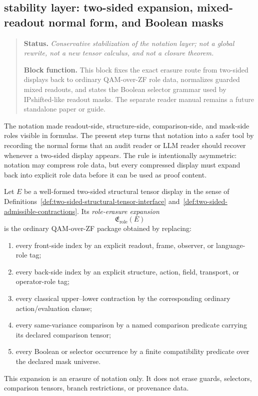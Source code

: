 \subsection*{stability layer: two-sided expansion, mixed-readout normal form, and Boolean masks}
\begin{quote}\small
\noindent\textbf{Status.} \emph{Conservative stabilization of the notation layer; not a global rewrite, not a new tensor calculus, and not a closure theorem.}\par
\noindent\textbf{Block function.} This block fixes the exact erasure route from two-sided displays back to ordinary QAM-over-ZF role data, normalizes guarded mixed readouts, and states the Boolean selector grammar used by IPshifted-like readout masks. The separate reader manual remains a future standalone paper or guide.
\end{quote}

The notation made readout-side, structure-side, comparison-side, and mask-side roles visible in formulas. The present step turns that notation into a safer tool by recording the normal forms that an audit reader or LLM reader should recover whenever a two-sided display appears. The rule is intentionally asymmetric: notation may compress role data, but every compressed display must expand back into explicit role data before it can be used as proof content.

\begin{definition}\label{def:r03-two-sided-role-erasure-map}
Let \(E\) be a well-formed two-sided structural tensor display in the sense of Definitions~\ref{def:two-sided-structural-tensor-interface} and~\ref{def:two-sided-admissible-contractions}. Its \emph{role-erasure expansion}
\[
\mathfrak{E}_{\mathrm{role}}(E)
\]
is the ordinary QAM-over-ZF package obtained by replacing:
\begin{enumerate}[leftmargin=2em]
 \item every front-side index by an explicit readout, frame, observer, or language-role tag;
 \item every back-side index by an explicit structure, action, field, transport, or operator-role tag;
 \item every classical upper--lower contraction by the corresponding ordinary action/evaluation clause;
 \item every same-variance comparison by a named comparison predicate carrying its declared comparison tensor;
 \item every Boolean or selector occurrence by a finite compatibility predicate over the declared mask universe.
\end{enumerate}
This expansion is an erasure of notation only. It does not erase guards, selectors, comparison tensors, branch restrictions, or provenance data.
\end{definition}

